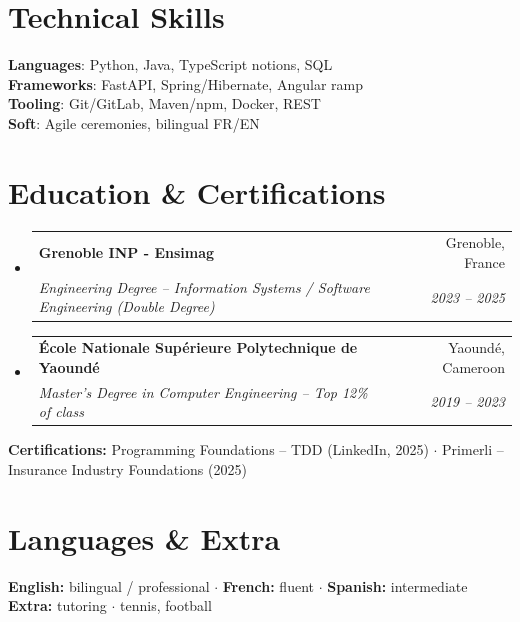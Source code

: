 \documentclass[letterpaper,10.5pt]{article}
\makeatletter
\newcommand{\resumeSubheading}[4]{\vspace{-1pt}\item\begin{tabular*}{0.97\textwidth}[t]{l@{\extracolsep{\fill}}r}\textbf{#1} & #2 \\\textit{\small#3} & \textit{\small #4} \\\end{tabular*}\vspace{-5pt}}
\newcommand{\resumeSubHeadingListStart}{\begin{itemize}[leftmargin=0.15in, label={}]}
\newcommand{\resumeSubHeadingListEnd}{\end{itemize}}
\makeatother
\begin{document}
\section{Technical Skills}
\begin{itemize}[leftmargin=0.15in, label={}]\small{\item{\textbf{Languages}: Python, Java, TypeScript notions, SQL \\ \textbf{Frameworks}: FastAPI, Spring/Hibernate, Angular ramp \\ \textbf{Tooling}: Git/GitLab, Maven/npm, Docker, REST \\ \textbf{Soft}: Agile ceremonies, bilingual FR/EN}}\end{itemize}
\section{Education \& Certifications}
\resumeSubHeadingListStart
  \resumeSubheading{Grenoble INP - Ensimag}{Grenoble, France}{Engineering Degree -- Information Systems / Software Engineering (Double Degree)}{2023 -- 2025}
  \resumeSubheading{\'Ecole Nationale Sup\'erieure Polytechnique de Yaound\'e}{Yaound\'e, Cameroon}{Master's Degree in Computer Engineering -- Top 12\% of class}{2019 -- 2023}
\resumeSubHeadingListEnd
\small{\textbf{Certifications:} Programming Foundations -- TDD (LinkedIn, 2025) $\cdot$ Primerli -- Insurance Industry Foundations (2025)}
\section{Languages \& Extra}
\small{\textbf{English:} bilingual / professional $\cdot$ \textbf{French:} fluent $\cdot$ \textbf{Spanish:} intermediate \\ \textbf{Extra:} tutoring $\cdot$ tennis, football}
\end{document}
